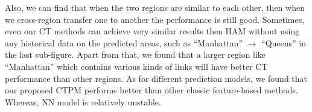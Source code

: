 Also, we can find that when the two regions are similar to each other, 
then when we cross-region transfer one to another the performance is still good. 
Sometimes, even our CT methods can achieve very similar results then HAM without using any historical data on the predicted areas, such as ``Manhattan'' $\rightarrow$ ``Queens'' in the last sub-figure.
Apart from that, we found that a larger region like ``Manhattan'' which contains various kinds of links will have better CT performance than other regions.
As for different prediction models, we found that our proposed CTPM performs better than other classic feature-based methods.
Whereas, NN model is relatively unstable. 



